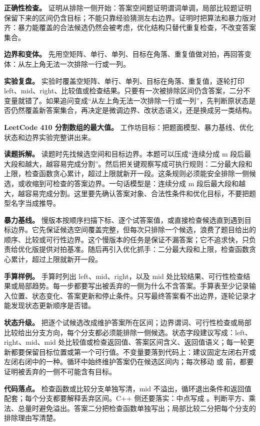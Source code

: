 \textbf{正确性检查。} 证明从排除一侧开始：答案空间题证明谓词单调，局部比较题证明保留下来的区间仍含目标；不能只靠经验猜测左右边界。证明时把算法和暴力版对齐：暴力能覆盖的合法候选仍然会被考虑，优化结构只替代重复检查，不改变答案集合。

\textbf{边界和变体。} 先用空矩阵、单行、单列、目标在角落、重复值做对拍，再回答变体：从左上角无法一次排除一行或一列。

\textbf{实验复盘。} 实验时覆盖空矩阵、单行、单列、目标在角落、重复值，逐轮打印 left、mid、right、比较值或检查结果。只要有一次被排除区间仍含答案，二分不变量就错了。如果追问变成“从左上角无法一次排除一行或一列”，先判断原状态是否仍然覆盖新答案集合，再决定是微调边界、改状态语义，还是换成另一类结构。

\noindent\textbf{LeetCode 410 分割数组的最大值。} 工作坊目标：把题面模型、暴力基线、优化状态和边界实验完整讲出来。

\textbf{读题拆解。} 读题时先找候选空间和目标边界。本题可以压成“连续分成 m 段后最大段和越大，越容易完成分割”。然后把关键观察写成可执行规则：二分最大段和上限，检查函数贪心累计，超过上限就新开一段。这条规则必须能安全排除一侧候选，或收缩到可检查的答案边界。一句话模型是：连续分成 m 段后最大段和越大，越容易完成分割。这里要先确认答案对象、合法性条件和优化目标，不要把题型名字当成推导。

\textbf{暴力基线。} 慢版本按顺序扫描下标、逐个试答案值，或直接检查候选直到遇到目标边界。它先保证候选空间覆盖完整，但每次只排除一个候选，浪费了题目给出的顺序、比较或可行性边界。这个慢版本的任务是保证不漏答案；它不追求快，只负责给优化版提供对拍基准。随后再引入优化抓手：二分最大段和上限，检查函数贪心累计，超过上限就新开一段。

\textbf{手算样例。} 手算时列出 left、mid、right，以及 mid 处比较结果、可行性检查结果或局部趋势。每一步都要写出被丢弃的一侧为什么不含答案。手算表至少记录输入位置、状态变化、答案更新和停止条件。只写最终答案看不出边界，逐轮记录才能发现状态更新顺序是否错。

\textbf{状态升级。} 把逐个试候选改成维护答案所在区间；边界谓词、可行性检查或局部比较给出分支方向，每个分支都必须能排除一侧候选。状态字段建议写成：left、right、mid、mid 处比较值或检查返回值、答案区间含义、返回值语义；每一轮更新都要保留目标位置或第一个可行值。不变量要落到代码上：建议固定左闭右开或左闭右闭中的一种。循环中始终维护答案仍在候选区间内；每次移动  或  前，都要证明被丢弃的一侧不可能含有目标。

\textbf{代码落点。} 检查函数或比较分支单独写清，mid 不溢出，循环退出条件和返回值配套；每个分支都要解释丢弃区间。C++ 侧还要落实：中点写成 。判断平方、乘法、总量时避免溢出。答案二分把检查函数单独写出；局部比较二分把每个分支的排除理由写清楚。

